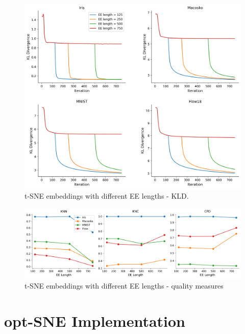 \begin{figure}[h]
    \centering 
        \includegraphics[width=\linewidth]{../code/figures/ee_length_kl_divergences_grid.png}
        \caption{t-SNE embeddings with different EE lengths - KLD.}
    \label{fig:EE_length_kld}
\end{figure}

\begin{figure}[h]
    \centering 
        \includegraphics[width=\linewidth]{../code/figures/ee_length_3_quality_measures.png}
        \caption{t-SNE embeddings with different EE lengths - quality measures}
    \label{fig:EE_length_quality}
\end{figure}


\newpage 
\section{opt-SNE Implementation}

